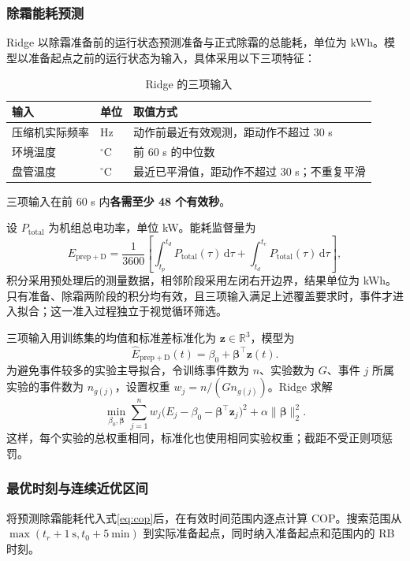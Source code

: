 \documentclass[UTF8,11pt,a4paper,fontset=fandol]{ctexart}
\begin{document}
\subsubsection{除霜能耗预测}
\label{sec:ridge}
Ridge 以除霜准备前的运行状态预测准备与正式除霜的总能耗，单位为 kWh。模型以准备起点之前的运行状态为输入，具体采用以下三项特征：
\begin{table}[H]
\centering\caption{Ridge 的三项输入}
\begin{tabularx}{\textwidth}{p{30mm}p{16mm}Y}
\toprule
输入 & 单位 & 取值方式 \\
\midrule
压缩机实际频率 & Hz & 动作前最近有效观测，距动作不超过 30 s \\
环境温度 & $^\circ$C & 前 60 s 的中位数 \\
盘管温度 & $^\circ$C & 最近已平滑值，距动作不超过 30 s；不重复平滑 \\
\bottomrule
\end{tabularx}
\end{table}
三项输入在前 60 s 内\textbf{各需至少 48 个有效秒}。

设 $P_{\mathrm{total}}$ 为机组总电功率，单位 kW。能耗监督量为
\begin{equation}
E_{\mathrm{prep+D}}=\frac{1}{3600}\left[
\int_{t_p}^{t_d}P_{\mathrm{total}}(\tau)\,\mathrm d\tau+
\int_{t_d}^{t_e}P_{\mathrm{total}}(\tau)\,\mathrm d\tau\right],
\label{eq:event}
\end{equation}
积分采用预处理后的测量数据，相邻阶段采用左闭右开边界，结果单位为 kWh。只有准备、除霜两阶段的积分均有效，且三项输入满足上述覆盖要求时，事件才进入拟合；这一准入过程独立于视觉循环筛选。

三项输入用训练集的均值和标准差标准化为 $\boldsymbol z\in\mathbb R^3$，模型为
\begin{equation}
\widehat E_{\mathrm{prep+D}}(t)=\beta_0+\boldsymbol\beta^\top\boldsymbol z(t).
\label{eq:ridge}
\end{equation}
为避免事件较多的实验主导拟合，令训练事件数为 $n$、实验数为 $G$、事件 $j$ 所属实验的事件数为 $n_{g(j)}$，设置权重 $w_j=n/(G n_{g(j)})$。Ridge 求解
\begin{equation}
\min_{\beta_0,\boldsymbol\beta}\sum_{j=1}^{n}w_j
\bigl(E_j-\beta_0-\boldsymbol\beta^\top\boldsymbol z_j\bigr)^2
+\alpha\lVert\boldsymbol\beta\rVert_2^2.
\end{equation}
这样，每个实验的总权重相同，标准化也使用相同实验权重；截距不受正则项惩罚。

\subsubsection{最优时刻与连续近优区间}
将预测除霜能耗代入式\eqref{eq:cop}后，在有效时间范围内逐点计算 COP。搜索范围从 $\max(t_r+1\ \mathrm{s},t_0+5\ \mathrm{min})$ 到实际准备起点，同时纳入准备起点和范围内的 RB 时刻。
\end{document}
